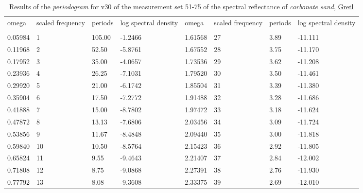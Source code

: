 \documentclass[11pt]{article}
\begin{document}
\begin{appendices}
\begin{table}[H]
	\begin{small}
	\caption{Results of the \textit{periodogram} for v30 of the measurement set 51-75 of the spectral reflectance of \textit{carbonate sand}, \href{http://gretl.sourceforge.net/}{Gretl}}
	\label{tab:30}
	\begin{center}
	\begin{tabular}{|p{15mm} p{15mm} p{15mm} p{15mm} || p{15mm} p{15mm}p{15mm} p{15mm}|}
		omega & scaled frequency & periods & log spectral density & omega & scaled frequency & periods & log spectral density \\ \\ \hline\hline
		0.05984      & 1    &      105.00  &      -1.2466  &  1.61568   &   27    &        3.89     &    -11.111\\ 
		 0.11968     &  2   &        52.50   &      -5.8761 &   1.67552   &   28    &        3.75     &    -11.170\\ 
		 0.17952     &  3   &        35.00   &      -4.0657 &  1.73536   &   29    &        3.62     &    -11.208\\ 
		 0.23936     &  4   &        26.25   &      -7.1031 &  1.79520   &   30    &        3.50     &    -11.461\\ 
		 0.29920     &  5   &        21.00   &      -6.1742 &  1.85504   &   31    &        3.39     &    -11.380\\ 
		 0.35904     &  6   &        17.50   &      -7.2772  & 1.91488    & 32     &       3.28      &   -11.686\\ 
		 0.41888     &  7     &      15.00   &      -8.7802 &  1.97472    &  33    &        3.18     &    -11.624\\ 
		 0.47872     &  8     &      13.13   &      -7.6806 & 2.03456    &  34    &        3.09         &-11.724\\ 
		 0.53856     &  9     &      11.67   &      -8.4848  & 2.09440    &  35    &        3.00    &     -11.818\\ 
		 0.59840     & 10    &       10.50  &       -8.5764 &    2.15423    &  36    &        2.92    &     -11.805\\ 
		 0.65824     & 11    &        9.55   &      -9.4643 &  2.21407    &  37    &        2.84    &     -12.002\\ 
		 0.71808     & 12    &        8.75   &      -9.0868 &  2.27391    &  38    &        2.76    &     -11.930\\ 
		 0.77792     & 13    &        8.08   &      -9.3608 &  2.33375    &  39    &        2.69    &     -12.010\\ 

\end{tabular}
\end{center}
\end{small}
\end{table}
\end{appendices}
\end{document}
